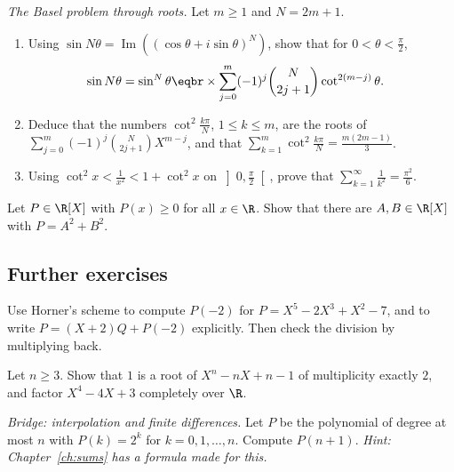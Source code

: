 \begin{exercise}[$\star\star\star$]\label{ex:basel}
\emph{The Basel problem through roots.} Let $m\ge1$ and $N=2m+1$.
\begin{enumerate}[label=(\alph*)]
\item Using $\sin N\theta=\operatorname{Im}\left((\cos\theta+i\sin\theta)^N\right)$, show that for $0<\theta<\frac\pi2$,
\[
\begin{aligned}\sin N\theta&=\sin^N\theta\eqbr\times\sum_{j=0}^m(-1)^j\binom N{2j+1}\cot^{2(m-j)}\theta.\end{aligned}
\]
\item Deduce that the numbers $\cot^2\frac{k\pi}N$, $1\le k\le m$, are the roots of $\sum_{j=0}^m(-1)^j\binom N{2j+1}X^{m-j}$, and that
$\displaystyle\sum_{k=1}^m\cot^2\frac{k\pi}N=\frac{m(2m-1)}3$.
\item Using $\cot^2x<\frac1{x^2}<1+\cot^2x$ on $\left]0,\frac\pi2\right[$, prove that $\displaystyle\sum_{k=1}^\infty\frac1{k^2}=\frac{\pi^2}6$.
\end{enumerate}
\end{exercise}

\begin{exercise}[$\star\star\star$]\label{ex:sos}
Let $P\in\R[X]$ with $P(x)\ge0$ for all $x\in\R$. Show that there are $A,B\in\R[X]$ with $P=A^2+B^2$.
\end{exercise}

\subsection*{Further exercises}

\begin{exercise}[$\star$]\label{ex:horner}
Use Horner's scheme to compute $P(-2)$ for $P=X^5-2X^3+X^2-7$, and to write $P=(X+2)Q+P(-2)$ explicitly. Then check the division by multiplying back.
\end{exercise}

\begin{exercise}[$\star$]\label{ex:multroot}
Let $n\ge3$. Show that $1$ is a root of $X^n-nX+n-1$ of multiplicity exactly $2$, and factor $X^4-4X+3$ completely over $\R$.
\end{exercise}

\begin{exercise}[$\star\star$]\label{ex:lagrange2k}
\emph{Bridge: interpolation and finite differences.} Let $P$ be the polynomial of degree at most $n$ with $P(k)=2^k$ for $k=0,1,\dots,n$. Compute $P(n+1)$. \emph{Hint: Chapter~\ref{ch:sums} has a formula made for this.}
\end{exercise}

